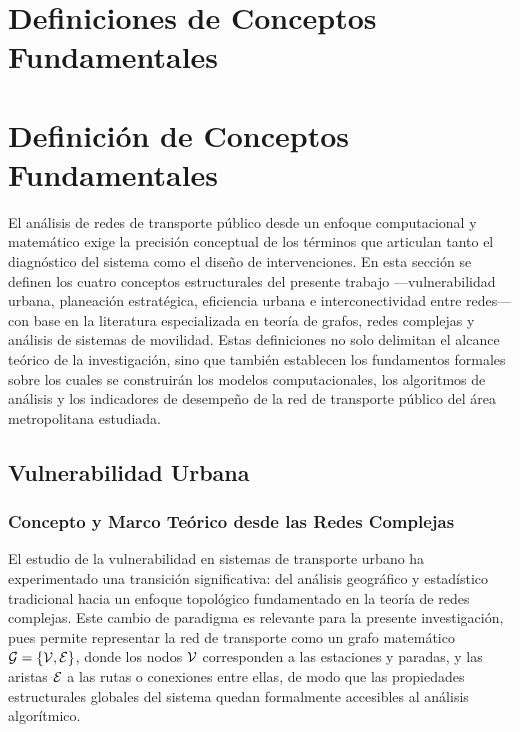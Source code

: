 \section*{Definiciones de Conceptos Fundamentales}
\label{ch:definiciones}


\section{Definición de Conceptos Fundamentales}
\label{sec:conceptos-fundamentales}

El análisis de redes de transporte público desde un enfoque computacional y
matemático exige la precisión conceptual de los términos que articulan tanto el
diagnóstico del sistema como el diseño de intervenciones. En esta sección se
definen los cuatro conceptos estructurales del presente trabajo ---vulnerabilidad
urbana, planeación estratégica, eficiencia urbana e interconectividad entre
redes--- con base en la literatura especializada en teoría de grafos, redes complejas
y análisis de sistemas de movilidad. Estas definiciones no solo delimitan el alcance
teórico de la investigación, sino que también establecen los fundamentos formales
sobre los cuales se construirán los modelos computacionales, los algoritmos de
análisis y los indicadores de desempeño de la red de transporte público del área
metropolitana estudiada.

\subsection{Vulnerabilidad Urbana}
\label{subsec:vulnerabilidad-urbana}

\subsubsection{Concepto y Marco Teórico desde las Redes Complejas}
\label{subsubsec:vulnerabilidad-redes-complejas}

El estudio de la vulnerabilidad en sistemas de transporte urbano ha experimentado
una transición significativa: del análisis geográfico y estadístico tradicional hacia
un enfoque topológico fundamentado en la teoría de redes complejas. Este cambio
de paradigma es relevante para la presente investigación, pues permite representar
la red de transporte como un grafo matemático $\mathcal{G} = \{\mathcal{V}, \mathcal{E}\}$,
donde los nodos $\mathcal{V}$ corresponden a las estaciones y paradas, y las aristas
$\mathcal{E}$ a las rutas o conexiones entre ellas, de modo que las propiedades
estructurales globales del sistema quedan formalmente accesibles al análisis
algorítmico.

